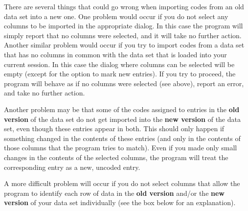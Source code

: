\documentclass{memoir}
\begin{document}
There are several things that could go wrong when importing codes from an old data set into a new one. One problem would occur if you do not select any columns to be imported in the appropriate dialog. In this case the program will simply report that no columns were selected, and it will take no further action. Another similar problem would occur if you try to import codes from a data set that has no columns in common with the data set that is loaded into your current session. In this case the dialog where columns can be selected will be empty (except for the option to mark new entries). If you try to proceed, the program will behave as if no columns were selected (see above), report an error, and take no further action.

Another problem may be that some of the codes assigned to entries in the \textbf{old version} of the data set do not get imported into the \textbf{new version} of the data set, even though these entries appear in both. This should only happen if something changed in the contents of these entries (and only in the contents of those columns that the program tries to match). Even if you made only small changes in the contents of the selected columns, the program will treat the corresponding entry as a new, uncoded entry. 

A more difficult problem will occur if you do not select columns that allow the program to identify each row of data in the \textbf{old version} and/or the \textbf{new version} of your data set individually (see the box below for an explanation).
\end{document}
